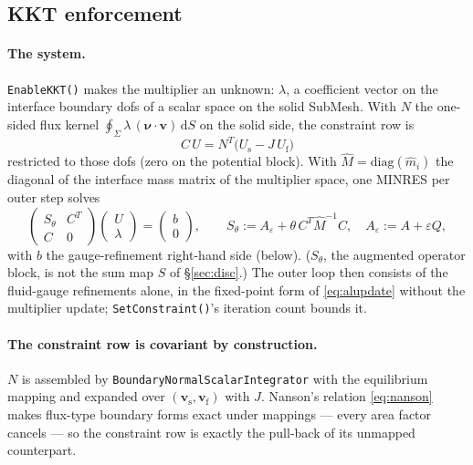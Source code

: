 \documentclass[11pt]{article}
\newcommand{\eps}{\varepsilon}
\newcommand{\bnu}{\bm{\nu}}
\newcommand{\bv}{\mathbf{v}}
\newcommand{\dS}{\,\mathrm{d}S}
\begin{document}
\subsection{KKT enforcement}
\label{sec:kkt}

\paragraph{The system.} \texttt{EnableKKT()} makes the multiplier an
unknown: $\lambda$, a coefficient vector on the interface boundary dofs
of a scalar space on the solid SubMesh. With $N$ the one-sided flux
kernel $\oint_\Sigma \lambda\,(\bnu\cdot\bv)\dS$ on the solid side, the
constraint row is
\[
  C\,U = N^{T}\bigl(U_{\mathrm{s}} - J\,U_{\mathrm{f}}\bigr)
\]
restricted to those dofs (zero on the potential block). With
$\hat M = \mathrm{diag}(\hat m_i)$ the diagonal of the interface mass
matrix of the multiplier space, one MINRES per outer step solves
\begin{equation}
  \begin{pmatrix} S_\theta & C^{T} \\ C & 0 \end{pmatrix}
  \begin{pmatrix} U \\ \lambda \end{pmatrix}
  =
  \begin{pmatrix} b \\ 0 \end{pmatrix},
  \qquad
  S_\theta := A_\eps + \theta\, C^{T}\hat M^{-1}C,
  \quad A_\eps := A + \eps Q ,
  \label{eq:kkt}
\end{equation}
with $b$ the gauge-refinement right-hand side (below). ($S_\theta$, the
augmented operator block, is not the sum map $S$ of \S\ref{sec:disc}.)
The outer loop then consists of the fluid-gauge refinements alone, in
the fixed-point form of \eqref{eq:alupdate} without the multiplier
update; \texttt{SetConstraint()}'s iteration count bounds it.

\paragraph{The constraint row is covariant by construction.} $N$ is
assembled by \texttt{BoundaryNormalScalarIntegrator} with the
equilibrium mapping and expanded over $(\bv_{\mathrm{s}},
\bv_{\mathrm{f}})$ with $J$. Nanson's relation \eqref{eq:nanson} makes
flux-type boundary forms exact under mappings --- every area factor
cancels --- so the constraint row is exactly the pull-back of its
unmapped counterpart.
\end{document}
